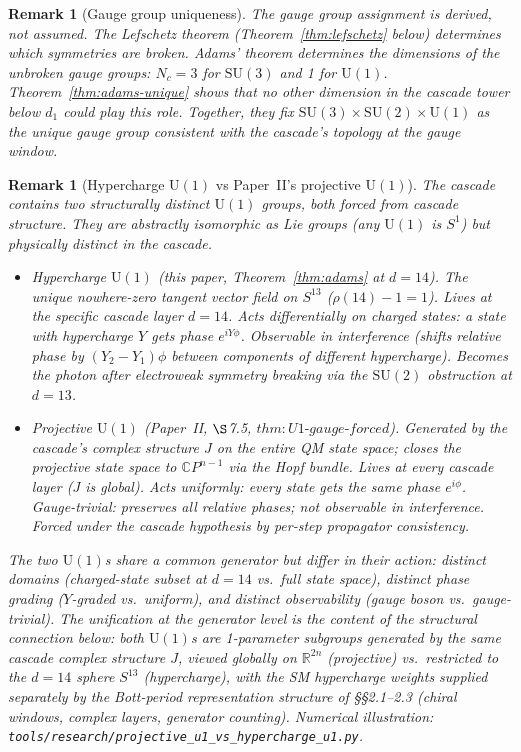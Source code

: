 \documentclass[12pt,a4paper]{article}
\newtheorem{remark}[theorem]{Remark}
\begin{document}
\begin{remark}[Gauge group uniqueness]
The gauge group assignment is derived, not assumed. The Lefschetz theorem
(Theorem~\ref{thm:lefschetz} below) determines which symmetries are broken.
Adams' theorem determines the dimensions of the unbroken gauge groups: $N_c=3$ for
$\mathrm{SU}(3)$ and 1 for $\mathrm{U}(1)$. Theorem~\ref{thm:adams-unique} shows that
no other dimension in the cascade tower below $d_1$ could play this role.
Together, they fix $\mathrm{SU}(3)\times\mathrm{SU}(2)\times\mathrm{U}(1)$ as the unique
gauge group consistent with the cascade's topology at the gauge window.
\end{remark}

\begin{remark}[Hypercharge $\mathrm{U}(1)$ vs Paper~II's projective $\mathrm{U}(1)$]\label{rem:u1-vs-projective}
The cascade contains two structurally distinct $\mathrm{U}(1)$ groups,
both forced from cascade structure. They are abstractly isomorphic as
Lie groups (any $\mathrm{U}(1)$ is $S^1$) but physically distinct in
the cascade.
\begin{itemize}
\item \emph{Hypercharge $\mathrm{U}(1)$ (this paper, Theorem~\ref{thm:adams}
at $d=14$).} The unique nowhere-zero tangent vector field on $S^{13}$
($\rho(14)-1 = 1$). Lives at the specific cascade layer $d=14$. Acts
\emph{differentially} on charged states: a state with hypercharge $Y$
gets phase $e^{iY\phi}$. Observable in interference (shifts relative
phase by $(Y_2-Y_1)\phi$ between components of different hypercharge).
Becomes the photon after electroweak symmetry breaking via the
$\mathrm{SU}(2)$ obstruction at $d=13$.
\item \emph{Projective $\mathrm{U}(1)$ (Paper~II, $\S$7.5,
$\mathit{thm{:}U1{\text{-}}gauge{\text{-}}forced}$).} Generated by the
cascade's complex structure $J$ on the entire QM state space; closes
the projective state space to $\mathbb{C}P^{n-1}$ via the Hopf bundle.
Lives at \emph{every} cascade layer ($J$ is global). Acts
\emph{uniformly}: every state gets the same phase $e^{i\phi}$.
Gauge-trivial: preserves all relative phases; not observable in
interference. Forced under the cascade hypothesis by per-step propagator
consistency.
\end{itemize}
The two $\mathrm{U}(1)$s share a common \emph{generator} but differ in
their \emph{action}: distinct domains (charged-state subset at $d=14$
vs.\ full state space), distinct phase grading ($Y$-graded vs.\
uniform), and distinct observability (gauge boson vs.\ gauge-trivial).
The unification at the generator level is the content of the
structural connection below: both $\mathrm{U}(1)$s are 1-parameter
subgroups generated by the same cascade complex structure $J$, viewed
globally on $\mathbb{R}^{2n}$ (projective) vs.\ restricted to the
$d=14$ sphere $S^{13}$ (hypercharge), with the SM hypercharge weights
supplied separately by the Bott-period representation structure of
\S\S2.1--2.3 (chiral windows, complex layers, generator counting).
Numerical illustration:
\texttt{tools/research/projective\_u1\_vs\_hypercharge\_u1.py}.


\end{remark}
\end{document}
